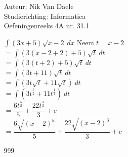 \documentclass[a4paper]{article}
\newcommand{\bint}{\displaystyle\int}
\begin{document}
  
\noindent \large Auteur: Nik Van Daele \\
\noindent \large Studierichting: Informatica\\
\noindent \large Oefeningenreeks 4A nr. 31.1\\

\medskip

\normalsize

$\bint (3x + 5) \sqrt{x - 2} \ dx$ Neem $t = x - 2$\\

$=\bint (3(x - 2 + 2) + 5)\sqrt{t} \ dt$\\

$=\bint (3(t + 2) + 5) \sqrt{t} \ dt$\\

$=\bint (3t + 11) \sqrt{t} \ dt$\\

$=\bint \left(3t\sqrt{t} + 11\sqrt{t}\right) \ dt$\\

$=\bint \left(3t^{\tfrac{3}{2}} + 11t^{\tfrac{1}{2}}\right) \ dt$\\

$= \dfrac{6t^{\tfrac{5}{2}}}{5} + \dfrac{22t^{\tfrac{3}{2}}}{3} + c$\\

$= \dfrac{6\sqrt{(x-2)^5}}{5} + \dfrac{22\sqrt{(x-2)^3}}{3} + c$\\



\begin{thebibliography}{999}
\end{thebibliography}
\end{document}
